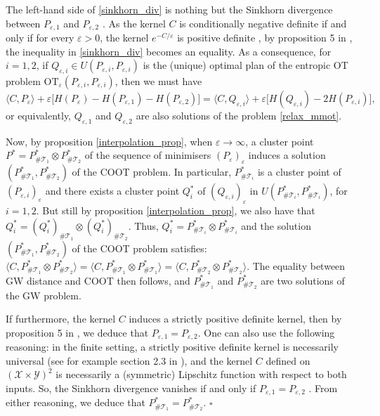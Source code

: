 \documentclass{article}
\newcommand{\qed}{\hfill $\square$}
\begin{document}
The left-hand side of \ref{sinkhorn_div} is nothing but the Sinkhorn divergence between $P_{\varepsilon, 1}$ and 
$P_{\varepsilon, 2}$ \citep{Ramdas17}. As the kernel $C$ is conditionally negative definite if and only if for every 
$\varepsilon > 0$, the kernel $e^{-C / \varepsilon}$ is positive definite \citep{Schoenberg38}, by proposition 5 in \citep{Janati20}, 
the inequality in \ref{sinkhorn_div} becomes an equality. As a consequence, for $i=1,2$, if 
$Q_{\varepsilon, i} \in U( P_{\varepsilon, i}, P_{\varepsilon, i})$ is the (unique) optimal plan of the entropic OT problem 
$\text{OT}_{\varepsilon}(P_{\varepsilon, i}, P_{\varepsilon, i})$, then we must have
\begin{equation*}
  \langle C, P_{\varepsilon} \rangle + \varepsilon \big[ H(P_{\varepsilon}) - H(P_{\varepsilon, 1}) - 
  H(P_{\varepsilon, 2}) \big] =  
  \langle C, Q_{\varepsilon, i} \rangle + \varepsilon \big[ H(Q_{\varepsilon, i}) - 2 H(P_{\varepsilon, i}) \big],
\end{equation*}
or equivalently, $Q_{\varepsilon, 1}$ and $Q_{\varepsilon, 2}$ are also solutions of the problem \ref{relax_mmot}.

Now, by proposition \ref{interpolation_prop}, when $\varepsilon \to \infty$, a cluster point 
$P^* = P^*_{\# \mathcal T_1} \otimes P^*_{\# \mathcal T_2}$ of the sequence of minimisers $(P_{\varepsilon})_{\varepsilon}$ induces a solution 
$(P^*_{\# \mathcal T_1}, P^*_{\# \mathcal T_2})$ of the COOT problem. In particular, $P^*_{\# \mathcal T_i}$ is a cluster point of 
$(P_{\varepsilon, i})_{\varepsilon}$ and there exists a cluster point $Q^*_i$ of 
$(Q_{\varepsilon, i})_{\varepsilon}$ in $U(P^*_{\# \mathcal T_i}, P^*_{\# \mathcal T_i})$, for $i=1,2$. But still by proposition 
\ref{interpolation_prop}, we also have that $Q^*_i = (Q^*_i)_{\# \mathcal T_1} \otimes (Q^*_i)_{\# \mathcal T_2}$. Thus, 
$Q^*_i = P^*_{\# \mathcal T_i} \otimes P^*_{\# \mathcal T_i}$ 
and the solution $(P^*_{\# \mathcal T_1}, P^*_{\# \mathcal T_2})$ of the COOT problem satisfies: 
$\langle C, P^*_{\# \mathcal T_1} \otimes P^*_{\# \mathcal T_2} \rangle = 
\langle C, P^*_{\# \mathcal T_1} \otimes P^*_{\# \mathcal T_1} \rangle = 
\langle C, P^*_{\# \mathcal T_2} \otimes P^*_{\# \mathcal T_2} \rangle$. The equality between GW distance and COOT then follows, 
and $P^*_{\# \mathcal T_1}$ and $P^*_{\# \mathcal T_2}$ are two solutions of the GW problem.

If furthermore, the kernel $C$ induces a strictly positive definite kernel, then by proposition 5 in \citep{Janati20}, 
we deduce that $P_{\varepsilon, 1} = P_{\varepsilon, 2}$. One can also use the following reasoning: 
in the finite setting, a strictly positive definite kernel is necessarily universal (see for example section 2.3 in 
\citep{Borgwardt06}), and the kernel $C$ defined on $(\mathcal X \times \mathcal Y)^2$ is necessarily a (symmetric) 
Lipschitz function with respect to both inputs. So, the Sinkhorn divergence vanishes if and only if 
$P_{\varepsilon, 1} = P_{\varepsilon, 2}$ \citep{Feydy19}. From either reasoning, we deduce that 
$P^*_{\# \mathcal T_1} = P^*_{\# \mathcal T_2}$. \qed
\end{document}
